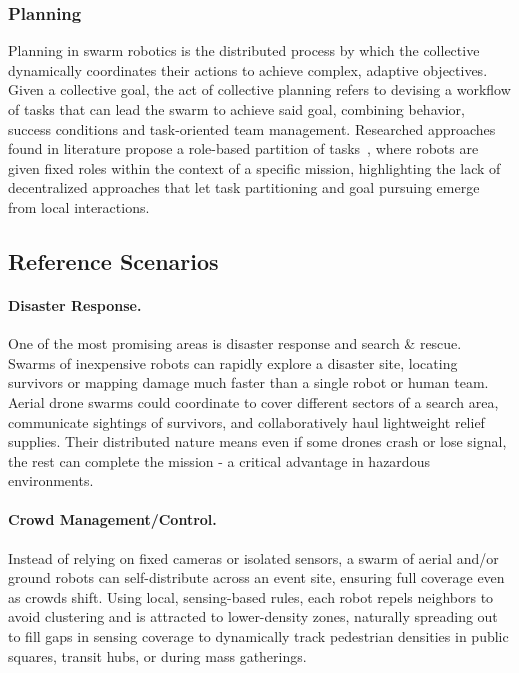 \documentclass[12pt]{article}
\begin{document}
\subsubsection{Planning}
Planning in swarm robotics is the distributed process by which the collective dynamically coordinates their actions to achieve complex, adaptive objectives.
Given a collective goal, the act of collective planning refers to devising a workflow of tasks that can lead the swarm to achieve said goal, combining behavior, success conditions and task-oriented team management.
Researched approaches found in literature propose a role-based partition of tasks~\cite{sampedro2016flexible}, where robots are given fixed roles within the context of a specific mission, highlighting the lack
of decentralized approaches that let task partitioning and goal pursuing emerge from local interactions.


\subsection{Reference Scenarios}
\label{sec:scenarios}

\paragraph{Disaster Response.} One of the most promising areas is disaster response and search \& rescue. Swarms of inexpensive robots can rapidly explore a disaster site, 
locating survivors or mapping damage much faster than a single robot or human team. 
Aerial drone swarms could coordinate to cover different sectors of a search area, communicate sightings of survivors, and collaboratively haul lightweight relief supplies. 
Their distributed nature means even if some drones crash or lose signal, the rest can complete the mission - a critical advantage in hazardous environments.

\paragraph{Crowd Management/Control.} 
Instead of relying on fixed cameras or isolated sensors, a swarm of aerial and/or ground robots can self-distribute across an event site, ensuring full coverage even as crowds shift.
Using local, sensing-based rules, each robot repels neighbors to avoid clustering and is attracted to lower-density zones, naturally spreading out to fill gaps in sensing coverage
to dynamically track pedestrian densities in public squares, transit hubs, or during mass gatherings.
\end{document}
